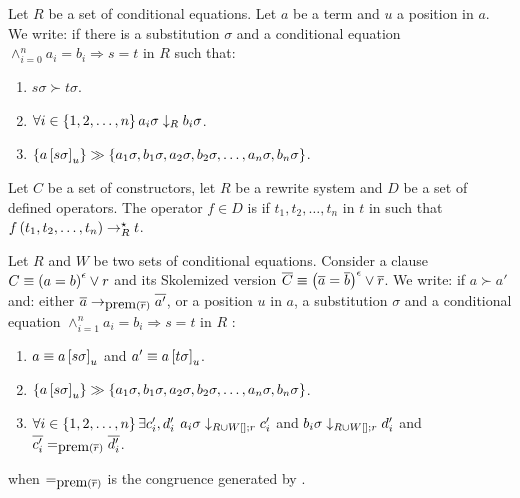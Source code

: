\begin{defi}
Let $R$ be a set of conditional equations. Let $a$ be a term and $u$ a position in $a$. We write:  if there is a substitution $\sigma$ and a conditional equation $\displaystyle\wedge_{i=0}^n a_i=b_i\Rightarrow s=t$ in $R$ such that:
\begin{enumerate}
 \item $s\sigma\succ t\sigma$.
 \item $\forall i\in\left\{ 1,2,\ldots,n\right\} a_i\sigma\downarrow_Rb_i\sigma$.
 \item $\left\{ a\left[ s\sigma\right]_u\right\}\gg\left\{ a_1\sigma,b_1\sigma,a_2\sigma,b_2\sigma,\ldots,a_n\sigma,b_n\sigma\right\}$.
\end{enumerate}
\cite{conf/ijcai/BouhoulaR93}
\end{defi}

\begin{defi}
Let $C$ be a set of constructors, let $R$ be a rewrite system and $D$ be a set of defined operators. The operator $f\in D$ is  if \faTx{} $t_1,t_2,\ldots,t_n$ in  \teTx{} $t$ in  such that $f\left(t_1,t_2,\ldots,t_n\right)\rightarrow_R^{\star} t$.
\cite{conf/ijcai/BouhoulaR93}
\end{defi}

\begin{defi}
Let $R$ and $W$ be two sets of conditional equations. Consider a clause $C\equiv\left( a=b\right)^{\epsilon}\vee r$ and its Skolemized version $\overline{C}\equiv\left( \overline{a}=\overline{b}\right)^{\epsilon}\vee\overline{r}$. We write:  if $a\succ a'$ and: either $\overline{a}\rightarrow_{\mbox{prem}\left(\overline{r}\right)}\overline{a'}$, or \teTx{} a position $u$ in $a$, a substitution $\sigma$ and a conditional equation $\displaystyle\wedge_{i=1}^n a_i=b_i\Rightarrow s=t$ in $R$ \stTx{}:
\begin{enumerate}
\item $a\equiv a\left[ s\sigma\right]_u$ and $a'\equiv a\left[ t\sigma\right]_u$.
\item $\left\{ a\left[ s\sigma\right]_u\right\}\gg\left\{ a_1\sigma,b_1\sigma,a_2\sigma,b_2\sigma,\ldots,a_n\sigma,b_n\sigma\right\}$.
\item $\forall i\in\left\{ 1,2,\ldots,n\right\} \exists c_i',d_i'$\stTx{} $a_i\sigma\downarrow_{R\cup W\left[ \right];r}c_i'$ and $b_i\sigma\downarrow_{R\cup W\left[ \right];r}d_i'$ and $\overline{c_i'}=_{\mbox{prem}\left(\overline{r}\right)}\overline{d_i'}$.
\end{enumerate}
when $=_{\mbox{prem}\left(\overline{r}\right)}$ is the congruence generated by .
\cite{conf/ijcai/BouhoulaR93}
\end{defi}

